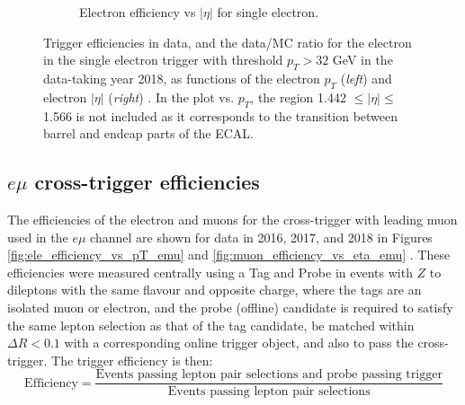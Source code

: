 \begin{figure}[h]
\begin{subfigure}{0.45\textwidth}
        \caption{Electron efficiency vs $|\eta|$ for single electron.}
        \label{fig:single_ele_32GeV_efficiency_vs_eta}
    \end{subfigure}
    \caption[Trigger efficiencies in data and the data/MC ratio for the electron in the single electron trigger with threshold $p_{T} > 32$ GeV in the data-taking year 2018, as functions of the electron $p_{T}$ (\textit{left}) and electron $|\eta|$ (\textit{right}).]{Trigger efficiencies in data, and the data/MC ratio for the electron in the single electron trigger with threshold $p_{T} > 32$ GeV in the data-taking year 2018, as functions of the electron $p_{T}$ (\textit{left}) and electron $|\eta|$ (\textit{right}) \cite{CMS-DP-2020-016}. In the plot vs. $p_{T}$, the region 1.442 $\leq |\eta| \leq$ 1.566 is not included as it corresponds to the transition between barrel and endcap parts of the ECAL.} 
\end{figure}


\subsection{\texorpdfstring{$e\mu$}{emu} cross-trigger efficiencies}

The efficiencies of the electron and muons for the cross-trigger with leading muon used in the $e\mu$ channel are shown for data in 2016, 2017, and 2018 in Figures \ref{fig:ele_efficiency_vs_pT_emu} and \ref{fig:muon_efficiency_vs_eta_emu} \cite{CMS-DP-2019-025}. These efficiencies were measured centrally using a Tag and Probe in events with $Z$ to dileptons with the same flavour and opposite charge, where the tags are an isolated muon or electron, and the probe (offline) candidate is required to satisfy the same lepton selection as that of the tag candidate, be matched within $\Delta R < 0.1$ with a corresponding online trigger object, and also to pass the cross-trigger. The trigger efficiency is then:
\begin{equation}
    \text{Efficiency} = \frac{\text{Events passing lepton pair selections and probe passing trigger}}{\text{Events passing lepton pair selections}}
\end{equation}

